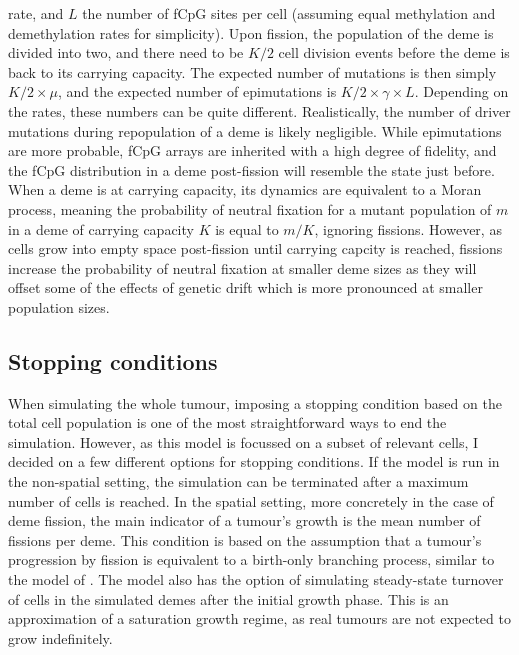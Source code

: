 rate, and $L$ the number of fCpG sites per cell (assuming equal methylation and
demethylation rates for simplicity). Upon fission, the population of the deme
is divided into two, and there need to be $K/2$ cell division events before the
deme is back to its carrying capacity. The expected number of mutations is then
simply $K/2\times\mu$, and the expected number of epimutations is
$K/2\times\gamma\times L$. Depending on the rates, these numbers can be quite
different. Realistically, the number of driver mutations during repopulation of
a deme is likely negligible. While epimutations are more probable, fCpG arrays
are inherited with a high degree of fidelity, and the fCpG distribution in a
deme post-fission will resemble the state just before. When a deme is at
carrying capacity, its dynamics are equivalent to a Moran process, meaning the
probability of neutral fixation for a mutant population of $m$ in a deme of
carrying capacity $K$ is equal to $m/K$, ignoring fissions. However, as cells
grow into empty space post-fission until carrying capcity is reached, fissions
increase the probability of neutral fixation at smaller deme sizes as they will
offset some of the effects of genetic drift which is more pronounced at smaller
population sizes.

\subsection{Stopping conditions}
When simulating the whole tumour, imposing a stopping condition based on the
total cell population is one of the most straightforward ways to end the
simulation. However, as this model is focussed on a subset of relevant cells, I
decided on a few different options for stopping conditions. If the model is run
in the non-spatial setting, the simulation can be terminated after a maximum
number of cells is reached. In the spatial setting, more concretely in the case
of deme fission, the main indicator of a tumour's growth is the mean number of
fissions per deme. This condition is based on the assumption that a tumour's
progression by fission is equivalent to a birth-only branching process, similar
to the model of \cite{sottoriva_big_2015}. The model also has the option of
simulating steady-state turnover of cells in the simulated demes after the
initial growth phase. This is an approximation of a saturation growth regime,
as real tumours are not expected to grow indefinitely.

